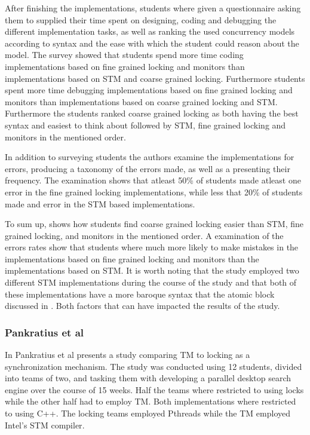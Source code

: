 After finishing the implementations, students where given a questionnaire asking them to supplied their time spent on designing, coding and debugging the different implementation tasks, as well as ranking the used concurrency models according to syntax and the ease with which the student could reason about the model. The survey showed that students spend more time coding implementations based on fine grained locking and monitors than implementations based on \ac{STM} and coarse grained locking\cite[p. 51]{rossbach2010transactional}. Furthermore students spent more time debugging implementations based on fine grained locking and monitors than implementations based on coarse grained locking and \ac{STM}\cite[p. 51]{rossbach2010transactional}. Furthermore the students ranked coarse grained locking as both having the best syntax and easiest to think about followed by \ac{STM}, fine grained locking and monitors in the mentioned order.

In addition to surveying students the authors examine the implementations for errors, producing a taxonomy of the errors made, as well as a presenting their frequency. The examination shows that atleast 50\% of students made atleast one error in the fine grained locking implementations, while less that 20\% of students made and error in the \ac{STM} based implementations. 

To sum up, \cite{rossbach2010transactional} shows how students find coarse grained locking easier than \ac{STM}, fine grained locking, and monitors in the mentioned order\cite[p. 54]{rossbach2010transactional}. A examination of the errors rates show that students where much more likely to make mistakes in the implementations based on fine grained locking and monitors than the implementations based on \ac{STM}\cite[p. 54]{rossbach2010transactional}. It is worth noting that the study employed two different \ac{STM} implementations during the course of the study and that both of these implementations have a more baroque syntax that the atomic block discussed in \cite[p. 49]{rossbach2010transactional}. Both factors that can have impacted the results of the study.

\subsubsection{Pankratius et al}
\label{sec:stm_ease_pankratius}
In \cite{pankratius2009does} Pankratius et al presents a study comparing \ac{TM} to locking as a synchronization mechanism. The study was conducted using 12 students, divided into teams of two, and tasking them with developing a parallel desktop search engine over the course of 15 weeks. Half the teams where restricted to using locks while the other half had to employ \ac{TM}. Both implementations where restricted to using C++. The locking teams employed Pthreads\cite[p. 2]{pankratius2009does} while the \ac{TM} employed Intel’s STM compiler\cite[p. 3]{pankratius2009does}.

